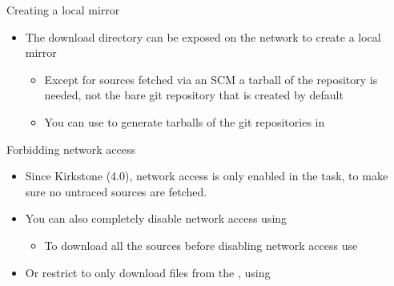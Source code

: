 \begin{frame}{Creating a local mirror}
  \begin{itemize}
    \item The download directory can be exposed on the network to create a
      local mirror
      \begin{itemize}
        \item Except for sources fetched via an SCM a tarball of the
          repository is needed, not the bare git repository that is created
          by default
        \item You can use  to
          generate tarballs of the git repositories in 
      \end{itemize}
  \end{itemize}
\end{frame}

\begin{frame}{Forbidding network access}
  \begin{itemize}
    \item Since Kirkstone (4.0), network access is only enabled
          in the  task, to make sure no untraced sources
	  are fetched.
    \item You can also completely disable network access using
      \begin{itemize}
      \item To download all the sources before disabling network access use
      \end{itemize}
    \item Or restrict  to only download files from the
      , using 
  \end{itemize}
\end{frame}
